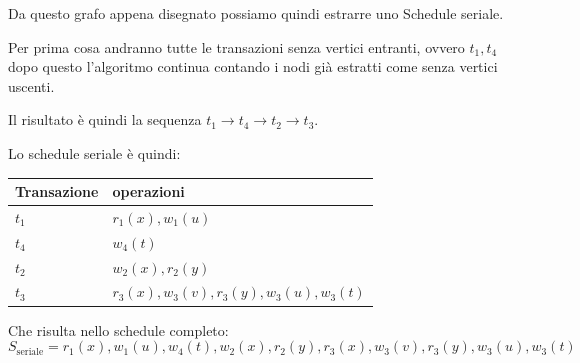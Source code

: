 \begin{exmp}
    Da questo grafo appena disegnato possiamo quindi estrarre uno Schedule seriale.

    Per prima cosa andranno tutte le transazioni senza vertici entranti, ovvero $t_1, t_4$ dopo questo l'algoritmo continua contando i nodi già estratti come senza vertici uscenti.

    Il risultato è quindi la sequenza $t_1 \rightarrow t_4 \rightarrow t_2 \rightarrow t_3$.
    
    Lo schedule seriale è quindi:

    
    \begin{center}
        \begin{tabularx}{10cm}{|p{25mm}|X|}
            \hline
            \rowcolor{gray!30}
            \textbf{Transazione} & \textbf{operazioni}\\
            \hline
            $t_1$& $r_1(x), w_1(u)$\\
            $t_4$& $w_4(t)$\\
            $t_2$& $w_2(x), r_2(y)$\\
            $t_3$& $r_3(x), w_3(v), r_3(y), w_3(u), w_3(t)$\\
            \hline
        \end{tabularx}
    \end{center}

    Che risulta nello schedule completo:
    \[S_\text{seriale} = r_1(x), w_1(u), w_4(t), w_2(x), r_2(y), r_3(x), w_3(v), r_3(y), w_3(u), w_3(t)\]
\end{exmp}

